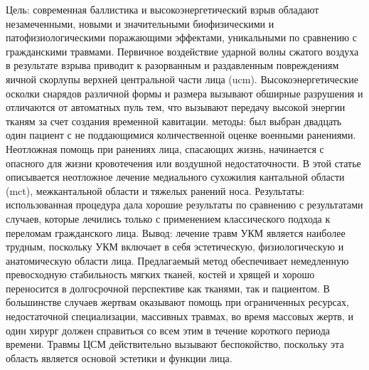 Цель: современная баллистика и высокоэнергетический взрыв обладают
незамеченными, новыми и значительными биофизическими и патофизиологическими
поражающими эффектами, уникальными по сравнению с гражданскими травмами.
Первичное воздействие ударной волны сжатого воздуха в результате взрыва приводит
к разорванным и раздавленным повреждениям яичной скорлупы верхней центральной
части лица (ucm). Высокоэнергетические осколки снарядов различной формы и
размера вызывают обширные разрушения и отличаются от автоматных пуль тем, что
вызывают передачу высокой энергии тканям за счет создания временной кавитации.
методы: был выбран двадцать один пациент с не поддающимися количественной оценке
военными ранениями. Неотложная помощь при ранениях лица, спасающих жизнь,
начинается с опасного для жизни кровотечения или воздушной недостаточности. В
этой статье описывается неотложное лечение медиального сухожилия кантальной
области (mct), межкантальной области и тяжелых ранений носа. Результаты:
использованная процедура дала хорошие результаты по сравнению с результатами
случаев, которые лечились только с применением классического подхода к переломам
гражданского лица. Вывод: лечение травм УКМ является наиболее трудным, поскольку
УКМ включает в себя эстетическую, физиологическую и анатомическую области лица.
Предлагаемый метод обеспечивает немедленную превосходную стабильность мягких
тканей, костей и хрящей и хорошо переносится в долгосрочной перспективе как
тканями, так и пациентом. В большинстве случаев жертвам оказывают помощь при
ограниченных ресурсах, недостаточной специализации, массивных травмах, во время
массовых жертв, и один хирург должен справиться со всем этим в течение короткого
периода времени. Травмы ЦСМ действительно вызывают беспокойство, поскольку эта
область является основой эстетики и функции лица.\cite{shuker2019}

